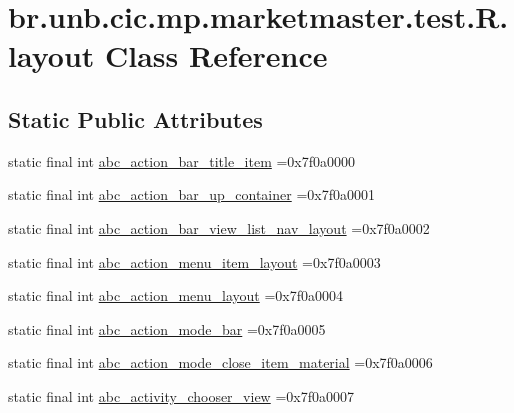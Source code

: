 \hypertarget{classbr_1_1unb_1_1cic_1_1mp_1_1marketmaster_1_1test_1_1R_1_1layout}{}\section{br.\+unb.\+cic.\+mp.\+marketmaster.\+test.\+R.\+layout Class Reference}
\label{classbr_1_1unb_1_1cic_1_1mp_1_1marketmaster_1_1test_1_1R_1_1layout}
\subsection*{Static Public Attributes}
\begin{DoxyCompactItemize}
\item 
static final int \mbox{\hyperlink{classbr_1_1unb_1_1cic_1_1mp_1_1marketmaster_1_1test_1_1R_1_1layout_a4507ad54f6be2056c89e6401e9c3655a}{abc\+\_\+action\+\_\+bar\+\_\+title\+\_\+item}} =0x7f0a0000
\item 
static final int \mbox{\hyperlink{classbr_1_1unb_1_1cic_1_1mp_1_1marketmaster_1_1test_1_1R_1_1layout_aeab6707474f6936e59cd485f551edae1}{abc\+\_\+action\+\_\+bar\+\_\+up\+\_\+container}} =0x7f0a0001
\item 
static final int \mbox{\hyperlink{classbr_1_1unb_1_1cic_1_1mp_1_1marketmaster_1_1test_1_1R_1_1layout_a6c3876f9d3cdffdfaae1f3d087dad93b}{abc\+\_\+action\+\_\+bar\+\_\+view\+\_\+list\+\_\+nav\+\_\+layout}} =0x7f0a0002
\item 
static final int \mbox{\hyperlink{classbr_1_1unb_1_1cic_1_1mp_1_1marketmaster_1_1test_1_1R_1_1layout_a2a83d7e1eba0260b1acd3d43b4d38f78}{abc\+\_\+action\+\_\+menu\+\_\+item\+\_\+layout}} =0x7f0a0003
\item 
static final int \mbox{\hyperlink{classbr_1_1unb_1_1cic_1_1mp_1_1marketmaster_1_1test_1_1R_1_1layout_a87f6d6702ddbee101dca4f0ea8a039af}{abc\+\_\+action\+\_\+menu\+\_\+layout}} =0x7f0a0004
\item 
static final int \mbox{\hyperlink{classbr_1_1unb_1_1cic_1_1mp_1_1marketmaster_1_1test_1_1R_1_1layout_a6983e8cd3e72c992479cb0a822dc712a}{abc\+\_\+action\+\_\+mode\+\_\+bar}} =0x7f0a0005
\item 
static final int \mbox{\hyperlink{classbr_1_1unb_1_1cic_1_1mp_1_1marketmaster_1_1test_1_1R_1_1layout_ab598079e29a04008ae2a8e2b6c7e9ab5}{abc\+\_\+action\+\_\+mode\+\_\+close\+\_\+item\+\_\+material}} =0x7f0a0006
\item 
static final int \mbox{\hyperlink{classbr_1_1unb_1_1cic_1_1mp_1_1marketmaster_1_1test_1_1R_1_1layout_aa20355522b0a677e5b063bbb4e8f29bb}{abc\+\_\+activity\+\_\+chooser\+\_\+view}} =0x7f0a0007

\end{DoxyCompactItemize}
